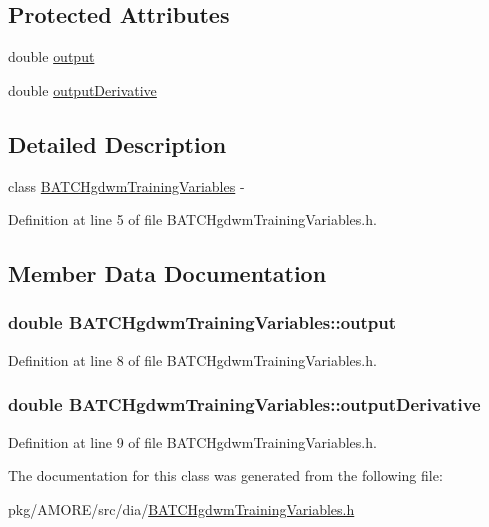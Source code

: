 \subsection*{Protected Attributes}
\begin{DoxyCompactItemize}
\item 
double \hyperlink{class_b_a_t_c_hgdwm_training_variables_a3f1f3635969b2d72bd117eda7afefada}{output}
\item 
double \hyperlink{class_b_a_t_c_hgdwm_training_variables_a985738d0f21b931cbb837ee3fa65dfcd}{outputDerivative}
\end{DoxyCompactItemize}


\subsection{Detailed Description}
class \hyperlink{class_b_a_t_c_hgdwm_training_variables}{BATCHgdwmTrainingVariables} -\/ 

Definition at line 5 of file BATCHgdwmTrainingVariables.h.



\subsection{Member Data Documentation}
\hypertarget{class_b_a_t_c_hgdwm_training_variables_a3f1f3635969b2d72bd117eda7afefada}{
\subsubsection[{output}]{\setlength{\rightskip}{0pt plus 5cm}double {\bf BATCHgdwmTrainingVariables::output}}}
\label{class_b_a_t_c_hgdwm_training_variables_a3f1f3635969b2d72bd117eda7afefada}


Definition at line 8 of file BATCHgdwmTrainingVariables.h.

\hypertarget{class_b_a_t_c_hgdwm_training_variables_a985738d0f21b931cbb837ee3fa65dfcd}{
\subsubsection[{outputDerivative}]{\setlength{\rightskip}{0pt plus 5cm}double {\bf BATCHgdwmTrainingVariables::outputDerivative}}}
\label{class_b_a_t_c_hgdwm_training_variables_a985738d0f21b931cbb837ee3fa65dfcd}


Definition at line 9 of file BATCHgdwmTrainingVariables.h.



The documentation for this class was generated from the following file:\begin{DoxyCompactItemize}
\item 
pkg/AMORE/src/dia/\hyperlink{_b_a_t_c_hgdwm_training_variables_8h}{BATCHgdwmTrainingVariables.h}\end{DoxyCompactItemize}
